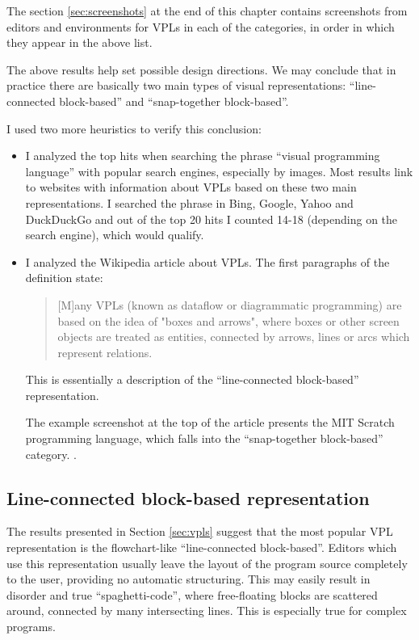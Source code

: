 The section \ref{sec:screenshots} at the end of this chapter contains screenshots from editors and environments for VPLs in each of the categories, in order in which they appear in the above list.

The above results help set possible design directions. We may conclude that in practice there are basically two main types of visual representations: ``line-connected block-based'' and ``snap-together block-based''.

I used two more heuristics to verify this conclusion:
\begin{itemize}
    \item I analyzed the top hits when searching the phrase ``visual programming language'' with popular search engines, especially by images. Most results link to websites with information about VPLs based on these two main representations. I searched the phrase in Bing, Google, Yahoo and DuckDuckGo and out of the top 20 hits I counted 14-18 (depending on the search engine), which would qualify.
    
    \item I analyzed the Wikipedia article about VPLs\cite{vpl_wikipedia}. The first paragraphs of the definition state:
    \begin{quote}
        [M]any VPLs (known as dataflow or diagrammatic programming)\cite{381508} are based on the idea of "boxes and arrows", where boxes or other screen objects are treated as entities, connected by arrows, lines or arcs which represent relations.
    \end{quote}
    
    This is essentially a description of the ``line-connected block-based'' representation.
    
    The example screenshot at the top of the article presents the MIT Scratch programming language, which falls into the ``snap-together block-based'' category. \cite[Section~VPL-II.B]{visual_languages}.
\end{itemize}

\subsection{Line-connected block-based representation}
The results presented in Section \ref{sec:vpls} suggest that the most popular VPL representation is the flowchart-like ``line-connected block-based''. Editors which use this representation usually leave the layout of the program source completely to the user, providing no automatic structuring. This may easily result in disorder and true ``spaghetti-code'', where free-floating blocks are scattered around, connected by many intersecting lines. This is especially true for complex programs.

